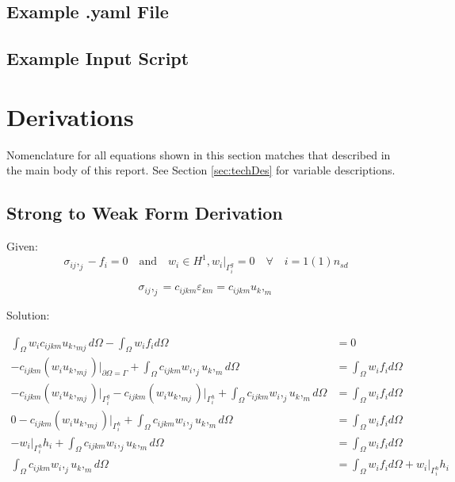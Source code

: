 \documentclass[a4paper, 12pt]{article}
\begin{document}
\newpage
\subsection{Example .yaml File} \label{subsec:ExYaml}


\newpage
\subsection{Example Input Script} \label{subsec:ExIn}


\newpage
\section{Derivations} \label{sec:Derivations}

Nomenclature for all equations shown in this section
matches that described in the main body of this report.
See Section \ref{sec:techDes} for variable descriptions.

\subsection{Strong to Weak Form Derivation} \label{sec:WeakDer}

Given:
\begin{equation*}
\sigma_{ij},_{j} - f_{i} = 0 \quad \text{and} \quad
w_{i} \in H^1, w_{i}\Big|_{\Gamma^{g}_{i}} = 0
    \quad \forall \quad i=1(1)n_{sd}
\end{equation*}

\begin{equation*}
\sigma_{ij},_{j} = c_{ijkm} \varepsilon_{km} = c_{ijkm} u_{k},_{m}
\end{equation*}

\noindent
Solution:

\begin{align*}
\int_{\Omega} w_{i} c_{ijkm} u_{k},_{mj} d\Omega -
  \int_{\Omega} w_{i} f_{i} d\Omega &= 0 \\
-c_{ijkm}(w_{i} u_{k},_{mj})\Big|_{\partial\Omega = \Gamma}
  + \int_{\Omega} c_{ijkm} w_{i},_{j} u_{k},_{m} d\Omega
  &=\int_{\Omega} w_{i} f_{i} d\Omega  \\
-c_{ijkm}(w_{i} u_{k},_{mj})\Big|_{\Gamma^{g}_{i}}
-c_{ijkm}(w_{i} u_{k},_{mj})\Big|_{\Gamma^{h}_{i}}
  + \int_{\Omega} c_{ijkm} w_{i},_{j} u_{k},_{m} d\Omega
  &=\int_{\Omega} w_{i} f_{i} d\Omega \\
0
 -c_{ijkm}(w_{i} u_{k},_{mj})\Big|_{\Gamma^{h}_{i}}
  + \int_{\Omega} c_{ijkm} w_{i},_{j} u_{k},_{m} d\Omega
  &=\int_{\Omega} w_{i} f_{i} d\Omega \\
-w_{i}\Big|_{\Gamma^{h}_{i}} h_{i}
  + \int_{\Omega} c_{ijkm} w_{i},_{j} u_{k},_{m} d\Omega
  &=\int_{\Omega} w_{i} f_{i} d\Omega \\
\int_{\Omega} c_{ijkm} w_{i},_{j} u_{k},_{m} d\Omega &=
  \int_{\Omega} w_{i} f_{i} d\Omega +
  w_{i}\Big|_{\Gamma^{h}_{i}} h_{i}
\end{align*}
\end{document}

